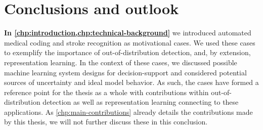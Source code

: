 
\chapter[conclusions and outlook]{Conclusions and outlook}\label{chp:conclusion}

\textbf{In \cref{chp:introduction,chp:technical-background}} we introduced automated medical coding and stroke recognition as motivational cases. 
We used these cases to exemplify the importance of out-of-distribution detection, and, by extension, representation learning. In the context of these cases, we discussed possible machine learning system designs for decision-support and considered potential sources of uncertainty and ideal model behavior. 
As such, the cases have formed a reference point for the thesis as a whole with contributions within out-of-distribution detection as well as representation learning connecting to these applications. 
As \cref{chp:main-contributions} already details the contributions made by this thesis, we will not further discuss these in this conclusion. 





